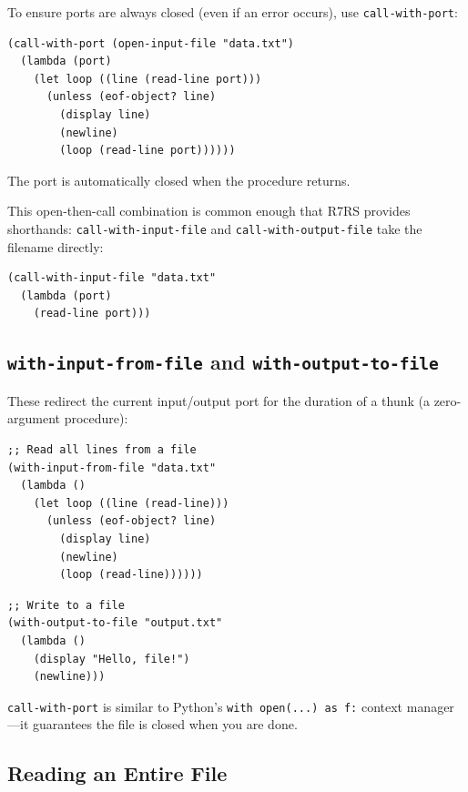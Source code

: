 To ensure ports are always closed (even if an error occurs), use \texttt{call-with-port}:

\begin{lstlisting}
(call-with-port (open-input-file "data.txt")
  (lambda (port)
    (let loop ((line (read-line port)))
      (unless (eof-object? line)
        (display line)
        (newline)
        (loop (read-line port))))))
\end{lstlisting}

The port is automatically closed when the procedure returns.

This open-then-call combination is common enough that R7RS provides shorthands: \texttt{call-with-input-file} and \texttt{call-with-output-file} take the filename directly:

\begin{lstlisting}
(call-with-input-file "data.txt"
  (lambda (port)
    (read-line port)))
\end{lstlisting}

\subsection{\texttt{with-input-from-file} and \texttt{with-output-to-file}}

These redirect the current input/output port for the duration of a thunk (a zero-argument procedure):

\begin{lstlisting}
;; Read all lines from a file
(with-input-from-file "data.txt"
  (lambda ()
    (let loop ((line (read-line)))
      (unless (eof-object? line)
        (display line)
        (newline)
        (loop (read-line))))))
\end{lstlisting}

\begin{lstlisting}
;; Write to a file
(with-output-to-file "output.txt"
  (lambda ()
    (display "Hello, file!")
    (newline)))
\end{lstlisting}

\begin{note}
\texttt{call-with-port} is similar to Python's \texttt{with open(...) as f:} context manager---it guarantees the file is closed when you are done.
\end{note}

\subsection{Reading an Entire File}

